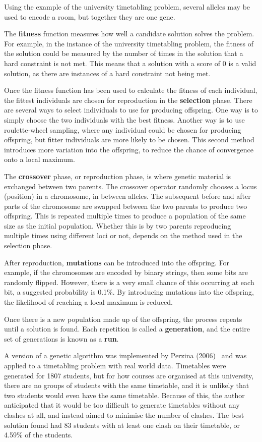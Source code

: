 Using the example of the university timetabling problem, several alleles may be
used to encode a room, but together they are one gene.

The \textbf{fitness} function measures how well a candidate solution solves the
problem.
For example, in the instance of the university timetabling problem, the fitness 
of the solution could be measured by the number of times in the solution that a
hard constraint is not met.
This means that a solution with a score of 0 is a valid solution, as there are
instances of a hard constraint not being met.

Once the fitness function has been used to calculate the fitness of each
individual, the fittest individuals are chosen for reproduction in the
\textbf{selection} phase.
There are several ways to select individuals to use for producing offspring.
One way is to simply choose the two individuals with the best fitness.
Another way is to use roulette-wheel sampling, where any individual could be
chosen for producing offspring, but fitter individuals are more likely to be
chosen.
This second method introduces more variation into the offspring, to reduce the
chance of convergence onto a local maximum.

The \textbf{crossover} phase, or reproduction phase, is where genetic material
is exchanged between two parents.
The crossover operator randomly chooses a locus (position) in a chromosome,
in between alleles.
The subsequent before and after parts of the chromosome are swapped between the
two parents to produce two offspring.
This is repeated multiple times to produce a population of the same size as the
initial population.
Whether this is by two parents reproducing multiple times using different loci
or not, depends on the method used in the selection phase.

After reproduction, \textbf{mutations} can be introduced into the offspring. 
For example, if the chromosomes are encoded by binary strings, then some bits 
are randomly flipped.
However, there is a very small chance of this occurring at each bit, a suggested
probability is 0.1\%.
By introducing mutations into the offspring, the likelihood of reaching a local
maximum is reduced.

Once there is a new population made up of the offspring, the process repeats 
until a solution is found.
Each repetition is called a \textbf{generation}, and the entire set of
generations is known as a \textbf{run}.

A version of a genetic algorithm was implemented by Perzina 
(2006)~\cite{ga_example} and was applied to a timetabling problem with real 
world data.
Timetables were generated for 1807 students, but for how courses are organised 
at this university, there are no groups of students with the same timetable, and
it is unlikely that two students would even have the same timetable.
Because of this, the author anticipated that it would be too difficult to
generate timetables without any clashes at all, and instead aimed to minimise
the number of clashes.
The best solution found had 83 students with at least one clash on their
timetable, or 4.59\% of the students.


